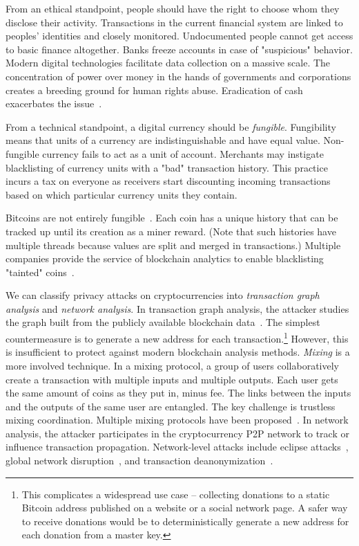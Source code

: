 From an ethical standpoint, people should have the right to choose whom they disclose their activity.
Transactions in the current financial system are linked to peoples' identities and closely monitored.
Undocumented people cannot get access to basic finance altogether.
Banks freeze accounts in case of "suspicious" behavior.
Modern digital technologies facilitate data collection on a massive scale.
The concentration of power over money in the hands of governments and corporations creates a breeding ground for human rights abuse.
Eradication of cash exacerbates the issue~\cite{Brito2019}.

From a technical standpoint, a digital currency should be \textit{fungible}.
Fungibility means that units of a currency are indistinguishable and have equal value.
Non-fungible currency fails to act as a unit of account.
Merchants may instigate blacklisting of currency units with a "bad" transaction history.
This practice incurs a tax on everyone as receivers start discounting incoming transactions based on which particular currency units they contain.

Bitcoins are not entirely fungible~\cite{Reid2011,Androulaki2013}.
Each coin has a unique history that can be tracked up until its creation as a miner reward.
(Note that such histories have multiple threads because values are split and merged in transactions.)
Multiple companies provide the service of blockchain analytics to enable blacklisting "tainted" coins~\cite{Elliptic, Chainalysis}.

We can classify privacy attacks on cryptocurrencies into \textit{transaction graph analysis} and \textit{network analysis}.
In transaction graph analysis, the attacker studies the graph built from the publicly available blockchain data~\cite{Meiklejohn2013, Ober2013, Ron2013}.
The simplest countermeasure is to generate a new address for each transaction.\footnote{This complicates a widespread use case -- collecting donations to a static Bitcoin address published on a website or a social network page. A safer way to receive donations would be to deterministically generate a new address for each donation from a master key.}
However, this is insufficient to protect against modern blockchain analysis methods.
\textit{Mixing} is a more involved technique.
In a mixing protocol, a group of users collaboratively create a transaction with multiple inputs and multiple outputs.
Each user gets the same amount of coins as they put in, minus fee.
The links between the inputs and the outputs of the same user are entangled.
The key challenge is trustless mixing coordination.
Multiple mixing protocols have been proposed~\cite{Maxwell2013, Bonneau2014, Ruffing2014, Valenta2015}.
In network analysis, the attacker participates in the cryptocurrency P2P network to track or influence transaction propagation.
Network-level attacks include eclipse attacks~\cite{Marcus2018, Henningsen2019}, global network disruption~\cite{Apostolaki2017}, and transaction deanonymization~\cite{Biryukov2014}.


